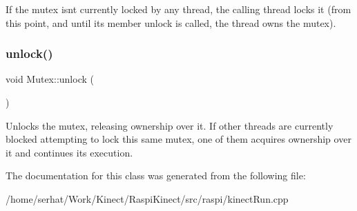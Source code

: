 If the mutex isn\textquotesingle{}t currently locked by any thread, the calling thread locks it (from this point, and until its member unlock is called, the thread owns the mutex). \hypertarget{class_mutex_a546a5b797ba29959357586aa2b3740a8}{}\label{class_mutex_a546a5b797ba29959357586aa2b3740a8} 
\subsubsection{\texorpdfstring{unlock()}{unlock()}}
{\footnotesize\ttfamily void Mutex\+::unlock (\begin{DoxyParamCaption}{ }\end{DoxyParamCaption})\hspace{0.3cm}{\ttfamily [inline]}}

Unlocks the mutex, releasing ownership over it. If other threads are currently blocked attempting to lock this same mutex, one of them acquires ownership over it and continues its execution. 

The documentation for this class was generated from the following file\+:\begin{DoxyCompactItemize}
\item 
/home/serhat/\+Work/\+Kinect/\+Raspi\+Kinect/src/raspi/kinect\+Run.\+cpp\end{DoxyCompactItemize}

